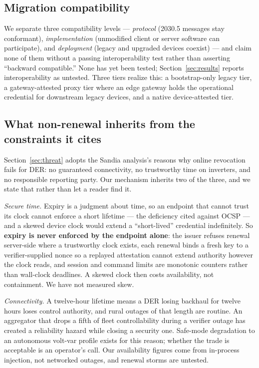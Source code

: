 \subsection{Migration compatibility}
We separate three compatibility levels --- \emph{protocol} (2030.5 messages stay conformant),
\emph{implementation} (unmodified client or server software can participate), and \emph{deployment}
(legacy and upgraded devices coexist) --- and claim none of them without a passing interoperability
test rather than asserting ``backward compatible.'' None has yet been tested;
Section~\ref{sec:results} reports interoperability as untested. Three tiers realize this: a
bootstrap-only legacy tier, a gateway-attested proxy tier where an edge gateway holds the
operational credential for downstream legacy devices, and a native device-attested tier.

\subsection{What non-renewal inherits from the constraints it cites}

Section~\ref{sec:threat} adopts the Sandia analysis's reasons why online revocation fails for DER:
no guaranteed connectivity, no trustworthy time on inverters, and no responsible reporting party.
Our mechanism inherits two of the three, and we state that rather than let a reader find it.

\emph{Secure time.} Expiry is a judgment about time, so an endpoint that cannot trust its clock
cannot enforce a short lifetime --- the deficiency cited against OCSP --- and a skewed device
clock would extend a ``short-lived'' credential indefinitely. So \textbf{expiry is never enforced
by the endpoint alone}: the issuer refuses renewal server-side where a trustworthy clock exists,
each renewal binds a fresh key to a verifier-supplied nonce so a replayed attestation cannot
extend authority however the clock reads, and session and command limits are monotonic counters
rather than wall-clock deadlines. A skewed clock then costs availability, not containment. We
have not measured skew.

\emph{Connectivity.} A twelve-hour lifetime means a DER losing backhaul for twelve hours loses
control authority, and rural outages of that length are routine. An aggregator that drops a fifth
of fleet controllability during a verifier outage has created a reliability hazard while closing a
security one. Safe-mode degradation to an autonomous volt-var profile exists for this reason;
whether the trade is acceptable is an operator's call. Our availability figures come from
in-process injection, not networked outages, and renewal storms are untested.

